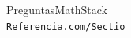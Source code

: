 \documentclass[12pt]{article}                               %
\begin{document}
\clearpage

    \begin{thebibliography}{9}

        PreguntasMathStack
        \\\texttt{Referencia.com/Sectio}


     

\end{thebibliography}
\end{document}
